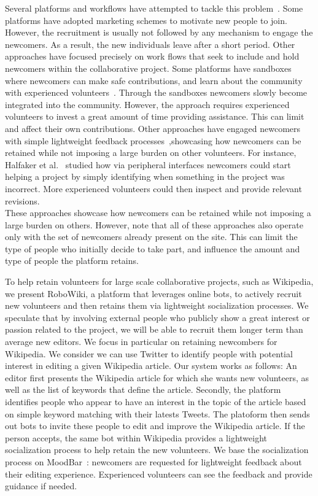 \documentclass{sigchi}
\begin{document}
Several platforms and workflows have attempted to tackle this problem~\cite{ciampaglia2015moodbar,halfaker2013making,morgan2013tea}. Some platforms have adopted  marketing schemes to motivate new people to join. However, the recruitment is usually not followed by any mechanism to engage the newcomers. As a result, the new individuals leave after a short period. Other approaches have focused precisely on work flows that seek to include and hold newcomers within the collaborative project.  Some platforms have sandboxes where newcomers can make safe contributions, and learn about the community with experienced volunteers~\cite{morgan2013tea}. Through the sandboxes newcomers slowly become integrated into the community. However, the approach requires experienced volunteers to invest a great amount of time providing assistance. This can limit and affect their own contributions.  Other approaches have engaged newcomers with simple lightweight feedback processes~\cite{ciampaglia2015moodbar},showcasing  how newcomers can be retained while not imposing a large burden on other volunteers. For instance, Halfaker et al.~\cite{halfaker2013making} studied how via peripheral interfaces newcomers could start helping a project by simply identifying when something in the project was incorrect. More experienced volunteers could then inspect and provide relevant revisions.\\ These approaches showcase how newcomers can be retained while not imposing a large burden on others. However, note that all of these approaches also operate only with the set of newcomers already present on the site. This can limit the type of people who initially decide to take part, and influence the amount and type of people the platform retains. 

To help retain volunteers for large scale collaborative projects, such as Wikipedia, we present RoboWiki, a platform that leverages online bots, to actively recruit  new volunteers and then retains them via lightweight socialization processes. We speculate that by involving external people who publicly show a great interest or passion related to the project, we will be able to recruit them longer term than average new editors. We focus in particular on retaining newcombers for Wikipedia. We consider we can use Twitter to identify people with potential interest in editing a given Wikipedia article.  
Our system works as follows: An editor first presents the Wikipedia article for which she wants new volunteers, as well as the list of keywords that define the article. Secondly, the platform identifies people who appear to have an interest in the topic of the article based on simple keyword matching with their latests Tweets. The platoform then sends out bots to invite these people to edit and improve the Wikipedia article. If the person accepts, the same bot within Wikipedia provides a lightweight socialization process to help retain the new volunteers. We base the socialization process on MoodBar~\cite{ciampaglia2015moodbar}: newcomers  are requested for lightweight feedback about their editing experience. Experienced volunteers can see the feedback and provide guidance if needed. 
\end{document}
